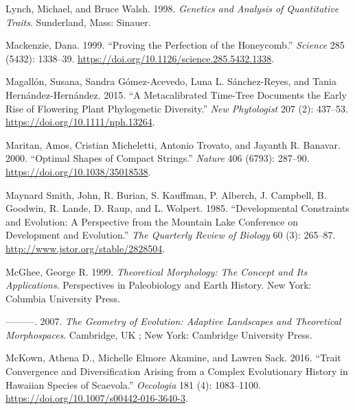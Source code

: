 \documentclass[
  12pt,
]{article}
\newlength{\cslhangindent}
\newlength{\cslentryspacingunit} %
\newenvironment{CSLReferences}[2] %
 {%
  \setlength{\parindent}{0pt}
  \ifodd #1
  \let\oldpar\par
  \def\par{\hangindent=\cslhangindent\oldpar}
  \fi
  \setlength{\parskip}{#2\cslentryspacingunit}
 }%
 {}
\begin{document}
\begin{CSLReferences}{1}{0}
\leavevmode{}%
Lynch, Michael, and Bruce Walsh. 1998. \emph{Genetics and Analysis of Quantitative Traits}. Sunderland, Mass: Sinauer.

\leavevmode{}%
Mackenzie, Dana. 1999. {``Proving the {Perfection} of the {Honeycomb}.''} \emph{Science} 285 (5432): 1338--39. \url{https://doi.org/10.1126/science.285.5432.1338}.

\leavevmode{}%
Magallón, Susana, Sandra Gómez-Acevedo, Luna L. Sánchez-Reyes, and Tania Hernández-Hernández. 2015. {``A Metacalibrated Time-Tree Documents the Early Rise of Flowering Plant Phylogenetic Diversity.''} \emph{New Phytologist} 207 (2): 437--53. \url{https://doi.org/10.1111/nph.13264}.

\leavevmode{}%
Maritan, Amos, Cristian Micheletti, Antonio Trovato, and Jayanth R. Banavar. 2000. {``Optimal Shapes of Compact Strings.''} \emph{Nature} 406 (6793): 287--90. \url{https://doi.org/10.1038/35018538}.

\leavevmode{}%
Maynard Smith, John, R. Burian, S. Kauffman, P. Alberch, J. Campbell, B. Goodwin, R. Lande, D. Raup, and L. Wolpert. 1985. {``Developmental {Constraints} and {Evolution}: {A} {Perspective} from the {Mountain} {Lake} {Conference} on {Development} and {Evolution}.''} \emph{The Quarterly Review of Biology} 60 (3): 265--87. \url{http://www.jstor.org/stable/2828504}.

\leavevmode{}%
McGhee, George R. 1999. \emph{Theoretical Morphology: The Concept and Its Applications}. Perspectives in Paleobiology and Earth History. New York: Columbia University Press.

\leavevmode{}%
---------. 2007. \emph{The Geometry of Evolution: Adaptive Landscapes and Theoretical Morphospaces}. Cambridge, UK ; New York: Cambridge University Press.

\leavevmode{}%
McKown, Athena D., Michelle Elmore Akamine, and Lawren Sack. 2016. {``Trait Convergence and Diversification Arising from a Complex Evolutionary History in {Hawaiian} Species of {Scaevola}.''} \emph{Oecologia} 181 (4): 1083--1100. \url{https://doi.org/10.1007/s00442-016-3640-3}.


\end{CSLReferences}
\end{document}
